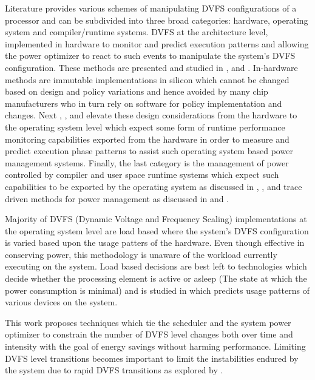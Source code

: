Literature provides various schemes of manipulating DVFS configurations of a processor and
can be subdivided into three broad categories: hardware, operating system and compiler/runtime systems. 
DVFS at the architecture level, implemented 
in hardware to monitor and predict execution patterns and allowing the power optimizer
to react to such events to manipulate the system's DVFS configuration. These methods are 
presented and studied in \cite{SystemLevel}, \cite{Phaseaware} and \cite{ImprovingFairness}.
In-hardware methods are immutable implementations in silicon which cannot be changed based on
design and policy variations and hence avoided by many chip manufacturers who in turn rely on software for policy 
implementation and changes. Next 
\cite{MultiOptimization}, \cite{LiveRuntime}, \cite{OperatingSystem} and \cite{schedulerHPC} elevate these design 
considerations from the hardware to the operating system level which expect some form
of runtime performance monitoring capabilities exported from the hardware in order to measure 
and predict execution phase patterns to assist such operating system based power management systems.
Finally, the last category is the management of power controlled by compiler and user space runtime systems
which expect such capabilities to be exported by the operating system as discussed in \cite{dynamic_compiler_f},
\cite{AnIntraTask}, \cite{compilerDirectedDVFS} and trace driven methods for power management as discussed
in \cite{adagio} and \cite{boundingEnergy}.
 

Majority of DVFS (Dynamic Voltage and Frequency Scaling) implementations at the operating system level are load based where
the system's DVFS configuration is varied based upon the usage patters of the hardware. Even though
effective in conserving power, this methodology is unaware of the workload currently executing on
the system. Load based decisions
are best left to technologies which decide whether the processing element 
is active or asleep (The state at which the power consumption is minimal) and is studied in
\cite{OperatingSystem} which predicts usage patterns of various devices on the system. 

This work proposes techniques which tie the scheduler and the system power optimizer to
constrain the number of DVFS level changes both over time and
intensity with the goal of  energy savings without harming
performance. Limiting DVFS level transitions becomes important to limit the instabilities endured by the system due to rapid
DVFS transitions as explored by \cite{ImpactDVFS}.

